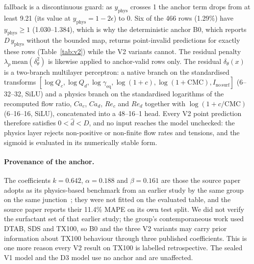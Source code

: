 \documentclass[11pt,a4paper]{article}
\newcommand{\tox}{TX100}
\begin{document}
fallback is a discontinuous guard: as $y_{\mathrm{phys}}$ crosses 1 the
anchor term drops from at least 9.21 (its value at
$y_{\mathrm{phys}}=1-2\epsilon$) to 0. Six of the 466 rows (1.29\%) have
$y_{\mathrm{phys}}\ge 1$ (1.030--1.384), which is why the deterministic
anchor B0, which reports $D\,y_{\mathrm{phys}}$ without the bounded map,
returns point-invalid predictions for exactly these rows
(Table~\ref{tab:v2}) while the V2 variants cannot. The residual penalty
$\lambda_p\,\mathrm{mean}(\delta_\theta^2)$ is likewise applied to
anchor-valid rows only. The residual $\delta_\theta(x)$ is a two-branch
multilayer perceptron: a native branch on the standardised transforms
$[\log Q_c,\log Q_d,\log\gamma_{\mathrm{eq}},\log(1+c),\log(1+\mathrm{CMC}),I_{\mathrm{no\,surf}}]$
(6--32--32, SiLU) and a physics branch on the standardised logarithms of the
recomputed flow ratio, $Ca_c$, $Ca_d$, $Re_c$ and $Re_d$ together with
$\log(1+c/\mathrm{CMC})$ (6--16--16, SiLU), concatenated into a 48--16--1
head. Every V2 point prediction therefore satisfies $0<\hat d<D$, and no
input reaches the model unchecked: the physics layer rejects non-positive or
non-finite flow rates and tensions, and the sigmoid is evaluated in its
numerically stable form.

\paragraph{Provenance of the anchor.} The coefficients $k=0.642$,
$\alpha=0.188$ and $\beta=0.161$ are those the source paper adopts as its
physics-based benchmark from an earlier study by the same group on the same
junction~\cite{kalli2022jcis,chagot2022}; they were not fitted on the evaluated
table, and the source paper reports their 11.4\% MAPE on its own test split.
We did not verify the surfactant set of that earlier study; the group's
contemporaneous work used DTAB, SDS and \tox{}, so B0 and the three V2
variants may carry prior information about \tox{} behaviour through three
published coefficients. This is one more reason every V2 result on \tox{} is
labelled retrospective. The sealed V1 model and the D3 model use no anchor
and are unaffected.
\end{document}

